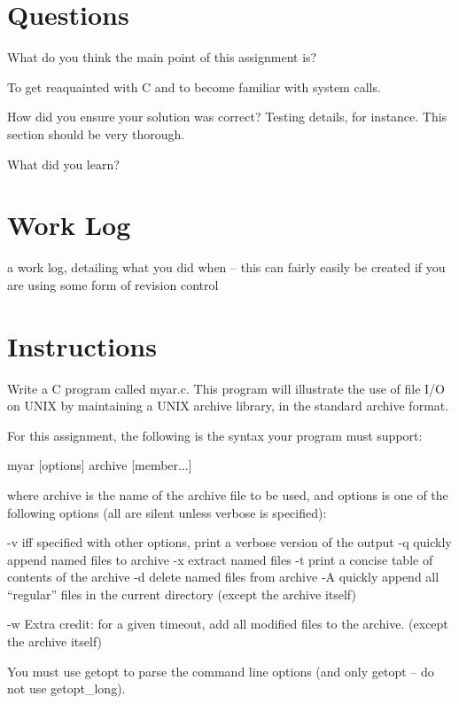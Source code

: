 \documentclass[letterpaper,10pt]{article}
\begin{document}
\section{Questions}
\begin{description}
  \item  What do you think the main point of this assignment is?
         
         To get reaquainted with C and to become familiar with system
         calls.

  \item  How did you ensure your solution was correct? Testing details, for
         instance. This section should be very thorough.
  \item  What did you learn?
\end{description}

\section{Work Log}
    a work log, detailing what you did when -- this can fairly easily be
    created if you are using some form of revision control

\newpage

\section*{Instructions}
Write a C program called myar.c. This program will illustrate the use of file
I/O on UNIX by maintaining a UNIX archive library, in the standard archive
format.

For this assignment, the following is the syntax your program must support:

myar [options] archive [member...]

where archive is the name of the archive file to be used, and options is one of
the following options (all are silent unless verbose is specified):

-v  iff specified with other options, print a verbose version of the output
-q  quickly append named files to archive    
-x  extract named files      
-t  print a concise table of contents of the archive     
-d  delete named files from archive      
-A  quickly append all ``regular'' files in the current directory   (except the
    archive itself)

-w  Extra credit: for a given timeout, add all modified files to the archive.
    (except the archive itself)

You must use getopt to parse the command line options (and only getopt -- do
not use getopt_long).
\end{document}
